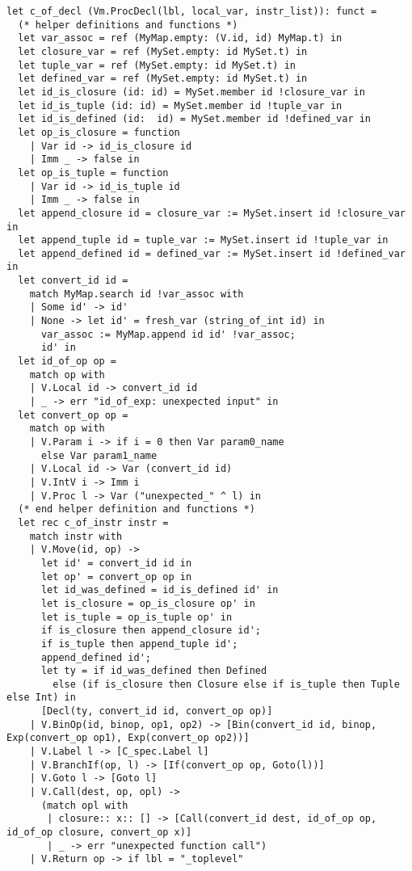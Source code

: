 \begin{lstlisting}[caption=backend.ml - C言語への変換]
let c_of_decl (Vm.ProcDecl(lbl, local_var, instr_list)): funct =
  (* helper definitions and functions *)
  let var_assoc = ref (MyMap.empty: (V.id, id) MyMap.t) in
  let closure_var = ref (MySet.empty: id MySet.t) in
  let tuple_var = ref (MySet.empty: id MySet.t) in
  let defined_var = ref (MySet.empty: id MySet.t) in
  let id_is_closure (id: id) = MySet.member id !closure_var in
  let id_is_tuple (id: id) = MySet.member id !tuple_var in
  let id_is_defined (id:  id) = MySet.member id !defined_var in
  let op_is_closure = function
    | Var id -> id_is_closure id
    | Imm _ -> false in
  let op_is_tuple = function
    | Var id -> id_is_tuple id
    | Imm _ -> false in
  let append_closure id = closure_var := MySet.insert id !closure_var in
  let append_tuple id = tuple_var := MySet.insert id !tuple_var in
  let append_defined id = defined_var := MySet.insert id !defined_var in
  let convert_id id = 
    match MyMap.search id !var_assoc with
    | Some id' -> id'
    | None -> let id' = fresh_var (string_of_int id) in
      var_assoc := MyMap.append id id' !var_assoc;
      id' in
  let id_of_op op = 
    match op with 
    | V.Local id -> convert_id id
    | _ -> err "id_of_exp: unexpected input" in
  let convert_op op = 
    match op with
    | V.Param i -> if i = 0 then Var param0_name
      else Var param1_name
    | V.Local id -> Var (convert_id id)
    | V.IntV i -> Imm i
    | V.Proc l -> Var ("unexpected_" ^ l) in
  (* end helper definition and functions *)
  let rec c_of_instr instr = 
    match instr with 
    | V.Move(id, op) -> 
      let id' = convert_id id in
      let op' = convert_op op in
      let id_was_defined = id_is_defined id' in
      let is_closure = op_is_closure op' in
      let is_tuple = op_is_tuple op' in
      if is_closure then append_closure id';
      if is_tuple then append_tuple id';
      append_defined id';
      let ty = if id_was_defined then Defined 
        else (if is_closure then Closure else if is_tuple then Tuple else Int) in
      [Decl(ty, convert_id id, convert_op op)]
    | V.BinOp(id, binop, op1, op2) -> [Bin(convert_id id, binop, Exp(convert_op op1), Exp(convert_op op2))]
    | V.Label l -> [C_spec.Label l]
    | V.BranchIf(op, l) -> [If(convert_op op, Goto(l))]
    | V.Goto l -> [Goto l]
    | V.Call(dest, op, opl) -> 
      (match opl with
       | closure:: x:: [] -> [Call(convert_id dest, id_of_op op, id_of_op closure, convert_op x)]
       | _ -> err "unexpected function call")
    | V.Return op -> if lbl = "_toplevel" 

\end{lstlisting}
